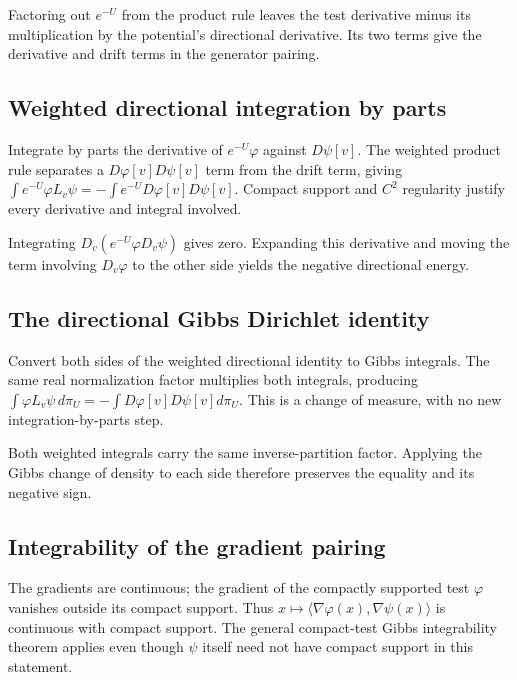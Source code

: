 \documentclass[11pt,a4paper]{article}
\begin{document}
Factoring out \(e^{-U}\) from the product rule leaves the test derivative minus its multiplication by the potential's directional derivative. Its two terms give the derivative and drift terms in the generator pairing.


\subsection{\texorpdfstring{Weighted directional integration by parts}{Weighted directional integration by parts}}


Integrate by parts the derivative of \(e^{-U}\varphi\) against \(D\psi[v]\). The weighted product rule separates a \(D\varphi[v]D\psi[v]\) term from the drift term, giving \(\int e^{-U}\varphi L_v\psi=-\int e^{-U}D\varphi[v]D\psi[v]\). Compact support and \(C^2\) regularity justify every derivative and integral involved.



Integrating \(D_v(e^{-U}\varphi D_v\psi)\) gives zero. Expanding this derivative and moving the term involving \(D_v\varphi\) to the other side yields the negative directional energy.


\subsection{\texorpdfstring{The directional Gibbs Dirichlet identity}{The directional Gibbs Dirichlet identity}}


Convert both sides of the weighted directional identity to Gibbs integrals. The same real normalization factor multiplies both integrals, producing \(\int\varphi L_v\psi\,d\pi_U=-\int D\varphi[v]D\psi[v]d\pi_U\). This is a change of measure, with no new integration-by-parts step.



Both weighted integrals carry the same inverse-partition factor. Applying the Gibbs change of density to each side therefore preserves the equality and its negative sign.


\subsection{\texorpdfstring{Integrability of the gradient pairing}{Integrability of the gradient pairing}}


The gradients are continuous; the gradient of the compactly supported test \(\varphi\) vanishes outside its compact support. Thus \(x\mapsto\langle\nabla\varphi(x),\nabla\psi(x)\rangle\) is continuous with compact support. The general compact-test Gibbs integrability theorem applies even though \(\psi\) itself need not have compact support in this statement.
\end{document}
